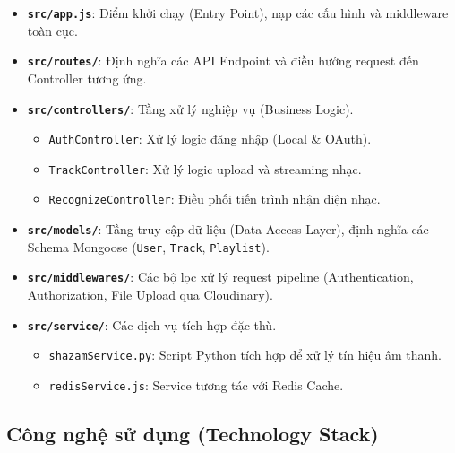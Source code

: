 \begin{itemize}
    \item \textbf{\texttt{src/app.js}}: Điểm khởi chạy (Entry Point), nạp các cấu hình và middleware toàn cục.
    \item \textbf{\texttt{src/routes/}}: Định nghĩa các API Endpoint và điều hướng request đến Controller tương ứng.
    \item \textbf{\texttt{src/controllers/}}: Tầng xử lý nghiệp vụ (Business Logic).
    \begin{itemize}
        \item \texttt{AuthController}: Xử lý logic đăng nhập (Local \& OAuth).
        \item \texttt{TrackController}: Xử lý logic upload và streaming nhạc.
        \item \texttt{RecognizeController}: Điều phối tiến trình nhận diện nhạc.
    \end{itemize}
    \item \textbf{\texttt{src/models/}}: Tầng truy cập dữ liệu (Data Access Layer), định nghĩa các Schema Mongoose (\texttt{User}, \texttt{Track}, \texttt{Playlist}).
    \item \textbf{\texttt{src/middlewares/}}: Các bộ lọc xử lý request pipeline (Authentication, Authorization, File Upload qua Cloudinary).
    \item \textbf{\texttt{src/service/}}: Các dịch vụ tích hợp đặc thù.
    \begin{itemize}
        \item \texttt{shazamService.py}: Script Python tích hợp để xử lý tín hiệu âm thanh.
        \item \texttt{redisService.js}: Service tương tác với Redis Cache.
    \end{itemize}
\end{itemize}

\subsection{Công nghệ sử dụng (Technology Stack)}

